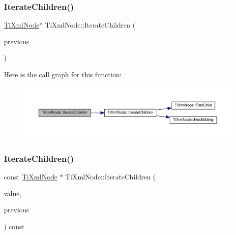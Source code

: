 \subsubsection{\texorpdfstring{Iterate\+Children()}{IterateChildren()}\hspace{0.1cm}{\footnotesize\ttfamily [2/4]}}
{\footnotesize\ttfamily \hyperlink{class_ti_xml_node}{Ti\+Xml\+Node}$\ast$ Ti\+Xml\+Node\+::\+Iterate\+Children (\begin{DoxyParamCaption}\item[{const \hyperlink{class_ti_xml_node}{Ti\+Xml\+Node} $\ast$}]{previous }\end{DoxyParamCaption})\hspace{0.3cm}{\ttfamily [inline]}}

Here is the call graph for this function\+:
\nopagebreak
\begin{figure}[H]
\begin{center}
\leavevmode
\includegraphics[width=350pt]{class_ti_xml_node_a2358e747118fdbf0e467b1e4f7d03de1_cgraph}
\end{center}
\end{figure}
\mbox{\label{class_ti_xml_node_a74bc68a536c279a42af346cb1454f143}} 
\subsubsection{\texorpdfstring{Iterate\+Children()}{IterateChildren()}\hspace{0.1cm}{\footnotesize\ttfamily [3/4]}}
{\footnotesize\ttfamily const \hyperlink{class_ti_xml_node}{Ti\+Xml\+Node} $\ast$ Ti\+Xml\+Node\+::\+Iterate\+Children (\begin{DoxyParamCaption}\item[{const char $\ast$}]{value,  }\item[{const \hyperlink{class_ti_xml_node}{Ti\+Xml\+Node} $\ast$}]{previous }\end{DoxyParamCaption}) const}



